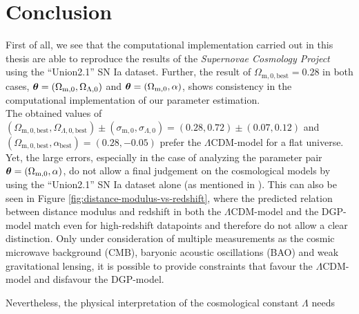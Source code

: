 \chapter{Conclusion}
\thispagestyle{empty}

\noindent First of all, we see that the computational implementation carried out in this thesis are able to reproduce the results of the \textit{Supernovae Cosmology Project} using the ``Union2.1'' SN Ia dataset.
Further, the result of $\Omega_{\text{m},0,\text{best}} = 0.28$ in both cases, $\vb*{\theta} = (\Omega_{\text{m},0}, \Omega_{\Lambda,0})$ and $\vb*{\theta} = (\Omega_{\text{m},0}, \alpha)$, shows consistency in the computational implementation of our parameter estimation. \\

\noindent The obtained values of $(\Omega_{\text{m}, 0, \text{best}}, \Omega_{\Lambda, 0, \text{best}}) \pm (\sigma_{\text{m}, 0}, \sigma_{\Lambda,0}) = (0.28, 0.72) \pm (0.07, 0.12)$ and \\
${(\Omega_{\text{m}, 0, \text{best}}, \alpha_{\text{best}}) = (0.28, -0.05)}$ prefer the $\Lambda$CDM-model for a flat universe. Yet, the large errors, especially in the case of analyzing the parameter pair $\vb*{\theta} = (\Omega_{\text{m},0}, \alpha)$, do not allow a final judgement on the cosmological models by using the ``Union2.1'' SN Ia dataset alone (as mentioned in \cite{Thomas2009}). This can also be seen in Figure \ref{fig:distance-modulus-vs-redshift}, where the predicted relation between distance modulus and redshift in both the $\Lambda$CDM-model and the DGP-model match even for high-redshift datapoints and therefore do not allow a clear distinction. Only under consideration of multiple measurements as the cosmic microwave background (CMB), baryonic acoustic oscillations (BAO) and weak gravitational lensing, it is possible to provide constraints that favour the $\Lambda$CDM-model and disfavour the DGP-model.

\noindent Nevertheless, the physical interpretation of the cosmological constant $\Lambda$ needs 
